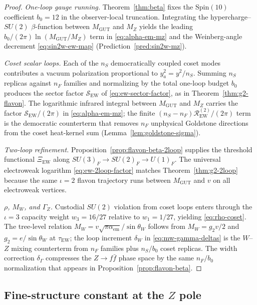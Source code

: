 \documentclass[aps,prd,onecolumn,amsmath,amssymb,nofootinbib,11pt]{revtex4-2}
\numberwithin{equation}{section}
\theoremstyle{plain}
\theoremstyle{definition}
\theoremstyle{remark}
\newcommand{\Spin}{\mathrm{Spin}}
\begin{document}
\begin{proof}
\emph{One-loop gauge running.}
Theorem~\ref{thm:beta} fixes the $\Spin(10)$ coefficient $b_0=12$ in the
observer-local truncation. Integrating the hypercharge--$SU(2)$ $\beta$-function
between $M_{\mathrm{GUT}}$ and $M_Z$ yields the leading
$b_0/(2\pi)\ln(M_{\mathrm{GUT}}/M_Z)$ term in \eqref{eq:alpha-em-mz} and the
Weinberg-angle decrement \eqref{eq:sin2w-ew-map}
(Prediction~\ref{pred:sin2w-mz}).

\emph{Coset scalar loops.}
Each of the $n_S$ democratically coupled coset modes contributes a vacuum
polarization proportional to $y_a^2= y^2/n_S$. Summing $n_S$ replicas against
$n_F$ families and normalizing by the total one-loop budget $b_0$ produces the
sector factor $\mathcal{S}_{\mathrm{EW}}$ of \eqref{eq:ew-sector-factor}, as in
Theorem~\ref{thm:g2-flavon}. The logarithmic infrared integral between
$M_{\mathrm{GUT}}$ and $M_Z$ carries the factor
$\mathcal{S}_{\mathrm{EW}}/(2\pi)$ in \eqref{eq:alpha-em-mz}; the finite
$(n_S-n_F)\mathcal{R}_{\mathrm{EW}}^{(2)}/(2\pi)$ term is the democratic
counterterm that removes $n_F$ unphysical Goldstone directions from the coset
heat-kernel sum (Lemma~\ref{lem:goldstone-sigma}).

\emph{Two-loop refinement.}
Proposition~\ref{prop:flavon-beta-2loop} supplies the threshold functional
$\Xi_{\mathrm{EW}}$ along $SU(3)_F\to SU(2)_F\to U(1)_F$. The universal
electroweak logarithm \eqref{eq:ew-2loop-factor} matches
Theorem~\ref{thm:g2-2loop} because the same $\iota=2$ flavon trajectory
runs between $M_{\mathrm{GUT}}$ and $v$ on all electroweak vertices.

\emph{$\rho$, $M_W$, and $\Gamma_Z$.}
Custodial $SU(2)$ violation from coset loops enters through the $\iota=3$
capacity weight $w_3=16/27$ relative to $w_1=1/27$, yielding
\eqref{eq:rho-coset}. The tree-level relation
$M_W=v\sqrt{\pi\alpha_{\mathrm{em}}}/\sin\theta_W$ follows from
$M_W=g_2 v/2$ and $g_2=e/\sin\theta_W$ at $\tau_{\mathrm{EW}}$; the loop
increment $\delta_W$ in \eqref{eq:mw-gamma-deltas} is the $W$--$Z$ mixing
counterterm from $n_F$ families plus $n_S/b_0$ coset replicas.
The width correction $\delta_\Gamma$ compresses the $Z\to f\bar f$ phase space
by the same $n_F/b_0$ normalization that appears in
Proposition~\ref{prop:flavon-beta}.
\end{proof}

\subsection{Fine-structure constant at the \texorpdfstring{$Z$}{Z} pole}
\label{sec:ew-precision:alpha}
\end{document}
